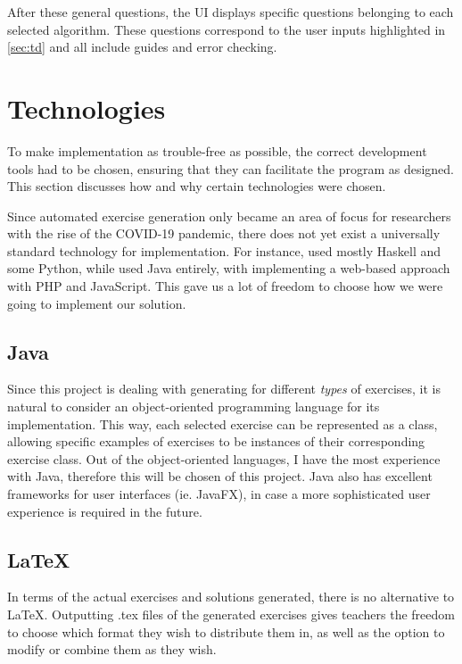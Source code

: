 \documentclass{l4proj}
\begin{document}
After these general questions, the UI displays specific questions belonging to each selected algorithm. These questions correspond to the user inputs highlighted in \autoref{sec:td} and all include guides and error checking.

\section{Technologies}

To make implementation as trouble-free as possible, the correct development tools had to be chosen, ensuring that they can facilitate the program as designed. This section discusses how and why certain technologies were chosen.

Since automated exercise generation only became an area of focus for researchers with the rise of the COVID-19 pandemic, there does not yet exist a universally standard technology for implementation. For instance, \citet{Hoz21} used mostly Haskell and some Python, while \citet {Esh22} used Java entirely, with \citet{Kot19} implementing a web-based approach with PHP and JavaScript. This gave us a lot of freedom to choose how we were going to implement our solution. 

\subsection{Java}

Since this project is dealing with generating for different \emph{types} of exercises, it is natural to consider an object-oriented programming language for its implementation. This way, each selected exercise can be represented as a class, allowing specific examples of exercises to be instances of their corresponding exercise class. Out of the object-oriented languages, I have the most experience with Java, therefore this will be chosen of this project. Java also has excellent frameworks for user interfaces (ie. JavaFX), in case a more sophisticated user experience is required in the future.

\subsection{LaTeX}

In terms of the actual exercises and solutions generated, there is no alternative to LaTeX. Outputting .tex files of the generated exercises gives teachers the freedom to choose which format they wish to distribute them in, as well as the option to modify or combine them as they wish.
 
\end{document}
